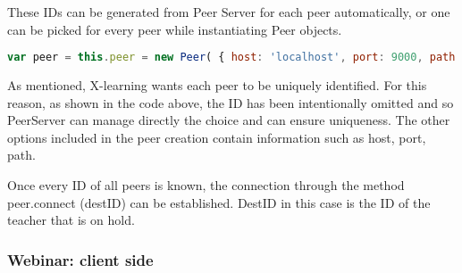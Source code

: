 These IDs can be generated from Peer Server for each peer automatically, or one can be picked for every peer while instantiating Peer objects.



\begin{lstlisting}[language=javascript]
var peer = this.peer = new Peer( { host: 'localhost', port: 9000, path: '/peerjs'});
\end{lstlisting}

As mentioned, X-learning wants each peer to be uniquely identified. For this reason, as shown in the code above, the ID has been intentionally omitted and so PeerServer can manage directly the choice and can ensure uniqueness.
The other options included in the peer creation contain information such as host, port, path.


Once every ID of all peers is known, the connection through the method peer.connect (destID) can be established. DestID in this case is the ID of the teacher that is on hold.

\subsubsection{Webinar: client side}

